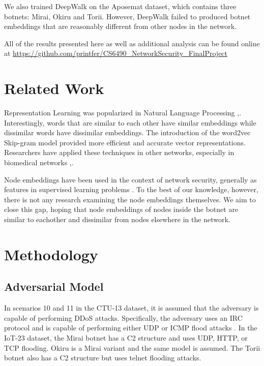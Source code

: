 \documentclass[10pt]{article}
\begin{document}
\begin{multicols}{2}
We also trained DeepWalk on the Aposemat \cite{IoT-23} dataset, which contains three botnets: Mirai, Okiru and Torii. However, DeepWalk failed to produced botnet embeddings that are reasonably different from other nodes in the network.

All of the results presented here as well as additional analysis can be found online at \url{https://github.com/printfer/CS6490_NetworkSecurity_FinalProject}

\section{Related Work}

Representation Learning was popularized in Natural Language Processing \cite{Camacho},\cite{Madelbaum}. Interestingly, words that are similar to each other have similar embeddings while dissimilar words have dissimilar embeddings. The introduction of the word2vec Skip-gram model \cite{Mikolov} provided more efficient and accurate vector representations.  Researchers have applied these techniques in other networks, especially in biomedical networks \cite{Perkins},\cite{Yue}.

Node embeddings have been used in the context of network security, generally as features in supervised learning problems \cite{Skorniakov}. To the best of our knowledge, however, there is not any research examining the node embeddings themselves. We aim to close this gap, hoping that node embeddings of nodes inside the botnet are similar to eachother and dissimilar from nodes elsewhere in the network.

\section{Methodology}

\subsection{Adversarial Model}
In scenarios 10 and 11 in the CTU-13 dataset, it is assumed that the adversary is capable of performing DDoS attacks. Specifically, the adversary uses an IRC protocol and is capable of performing either UDP or ICMP flood attacks \cite{Garcia}. In the IoT-23 dataset, the Mirai botnet has a C2 structure and uses UDP, HTTP, or TCP flooding. Okiru is a Mirai variant and the same model is assumed. The Torii botnet also has a C2 structure but uses telnet flooding attacks.


\end{multicols}
\end{document}
